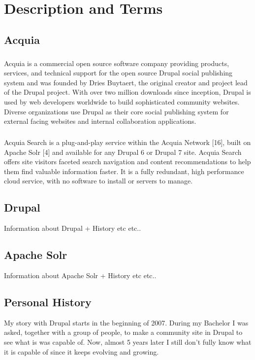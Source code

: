 \chapter{Description and Terms}
\section{Acquia}
\paragraph{} 
Acquia is a commercial open source software company providing products, services, and technical support for the open source Drupal social publishing system and was founded by Dries Buytaert, the original creator and project lead of the Drupal project. With over two million downloads since inception, Drupal is used by web developers worldwide to build sophisticated community websites. Diverse organizations use Drupal as their core social publishing system for external facing websites and internal collaboration applications.

\paragraph{}
Acquia Search is a plug-and-play service within the Acquia Network [16], built on Apache Solr [4] and available for any Drupal 6 or Drupal 7 site. Acquia Search offers site visitors faceted search navigation and content recommendations to help them find valuable information faster. It is a fully redundant, high performance cloud service, with no software to install or servers to manage.

\section{Drupal}
Information about Drupal + History etc etc..

\section{Apache Solr}
Information about Apache Solr + History etc etc..

\section{Personal History}
My story with Drupal starts in the beginning of 2007. During my Bachelor I was asked, together with a group of people, to make a community site in Drupal to see what is was capable of. Now, almost 5 years later I still don't fully know what it is capable of since it keeps evolving and growing.

